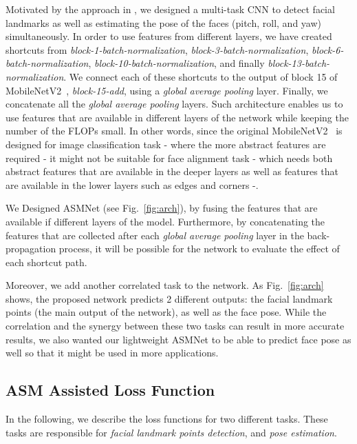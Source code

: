 \documentclass[final]{cvpr}
\begin{document}
Motivated by the approach in \cite{ranjan2017hyperface}, we designed a multi-task CNN to detect facial landmarks as well as estimating the pose of the faces (pitch, roll, and yaw) simultaneously. 
In order to use features from different layers, we have created shortcuts from \textit{block-1-batch-normalization}, \textit{block-3-batch-normalization}, \textit{block-6-batch-normalization}, \textit{block-10-batch-normalization}, and finally \textit{block-13-batch-normalization}. We connect each of these shortcuts to the output of block 15 of MobileNetV2~\cite{sandler2018mobilenetv2}, \textit{block-15-add}, using a \textit{global average pooling} layer. Finally, we concatenate all the \textit{global average pooling} layers. Such architecture enables us to use features that are available in different layers of the network while keeping the number of the FLOPs small. In other words, since the original MobileNetV2~\cite{sandler2018mobilenetv2} is designed for image classification task - where the more abstract features are required - it might not be suitable for face alignment task - which needs both abstract features that are available in the deeper layers as well as features that are available in the lower layers such as edges and corners -. 

We Designed ASMNet (see Fig.~\ref{fig:arch}), by fusing the features that are available if different layers of the model. Furthermore, by concatenating the features that are collected after each \textit{global average pooling} layer in the back-propagation process, it will be possible for the network to evaluate the effect of each shortcut path.

Moreover, we add another correlated task to the network. As Fig.~\ref{fig:arch} shows, the proposed network predicts 2 different outputs: the facial landmark points (the main output of the network), as well as the face pose. While the correlation and the synergy between these two tasks can result in more accurate results, we also wanted our lightweight ASMNet to be able to predict face pose as well so that it might be used in more applications.

\subsection{ASM Assisted Loss Function} \label{sec:asmloss}
In the following, we describe the loss functions for two different tasks. These tasks are responsible for \textit{facial landmark points detection}, and \textit{pose estimation}.
\end{document}
